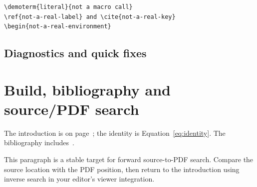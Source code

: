 \documentclass[11pt]{article}
\begin{document}
\begin{verbatim}
\demoterm{literal}{not a macro call}
\ref{not-a-real-label} and \cite{not-a-real-key}
\begin{not-a-real-environment}
\end{verbatim}

\subsection{Diagnostics and quick fixes}

%
%
%
%


\newpage
\section{Build, bibliography and source/PDF search}
\label{sec:build}

The introduction is on page~\pageref{sec:intro}; the identity is
Equation~\eqref{eq:identity}. The bibliography includes~\cite{knuth1984,shannon1948}.

This paragraph is a stable target for forward source-to-PDF search.
Compare the source location with the PDF position, then return to the
introduction using inverse search in your editor's viewer integration.



\end{document}
